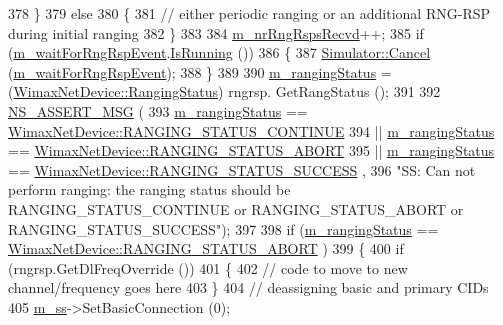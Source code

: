 \begin{DoxyCode}
378     \}
379   \textcolor{keywordflow}{else}
380     \{
381       \textcolor{comment}{// either periodic ranging or an additional RNG-RSP during initial ranging}
382     \}
383 
384   \hyperlink{classns3_1_1SSLinkManager_a52b9d5b8bc2d27a3ef604735ee731afc}{m\_nrRngRspsRecvd}++;
385   \textcolor{keywordflow}{if} (\hyperlink{classns3_1_1SSLinkManager_a6e94b74ad20fe217bf121b94deeca1ba}{m\_waitForRngRspEvent}.\hyperlink{classns3_1_1EventId_aabf8476d1a080c199ea0c6aa9ccea372}{IsRunning} ())
386     \{
387       \hyperlink{classns3_1_1Simulator_a1b903a62d6117ef28f7ba3c6500689bf}{Simulator::Cancel} (\hyperlink{classns3_1_1SSLinkManager_a6e94b74ad20fe217bf121b94deeca1ba}{m\_waitForRngRspEvent});
388     \}
389 
390   \hyperlink{classns3_1_1SSLinkManager_ae21f07956edc47367365d56c7913eee7}{m\_rangingStatus} = (\hyperlink{classns3_1_1WimaxNetDevice_a2a74c0f01e51abc1851a630242e7b591}{WimaxNetDevice::RangingStatus}) rngrsp.
      GetRangStatus ();
391 
392   \hyperlink{assert_8h_aff5ece9066c74e681e74999856f08539}{NS\_ASSERT\_MSG} (
393     \hyperlink{classns3_1_1SSLinkManager_ae21f07956edc47367365d56c7913eee7}{m\_rangingStatus} == \hyperlink{classns3_1_1WimaxNetDevice_a2a74c0f01e51abc1851a630242e7b591ace0a03105b6d7cf2c6ec79e9789dc3a6}{WimaxNetDevice::RANGING\_STATUS\_CONTINUE}
394     || \hyperlink{classns3_1_1SSLinkManager_ae21f07956edc47367365d56c7913eee7}{m\_rangingStatus} == \hyperlink{classns3_1_1WimaxNetDevice_a2a74c0f01e51abc1851a630242e7b591af8ad5e66165cedeaf588275f529a4a98}{WimaxNetDevice::RANGING\_STATUS\_ABORT}
395     || \hyperlink{classns3_1_1SSLinkManager_ae21f07956edc47367365d56c7913eee7}{m\_rangingStatus} == \hyperlink{classns3_1_1WimaxNetDevice_a2a74c0f01e51abc1851a630242e7b591a2a48f503c20971a1a5901af0b6d0746c}{WimaxNetDevice::RANGING\_STATUS\_SUCCESS}
      ,
396     \textcolor{stringliteral}{"SS: Can not perform ranging: the ranging status should be RANGING\_STATUS\_CONTINUE or
       RANGING\_STATUS\_ABORT or RANGING\_STATUS\_SUCCESS"});
397 
398   \textcolor{keywordflow}{if} (\hyperlink{classns3_1_1SSLinkManager_ae21f07956edc47367365d56c7913eee7}{m\_rangingStatus} == \hyperlink{classns3_1_1WimaxNetDevice_a2a74c0f01e51abc1851a630242e7b591af8ad5e66165cedeaf588275f529a4a98}{WimaxNetDevice::RANGING\_STATUS\_ABORT}
      )
399     \{
400       \textcolor{keywordflow}{if} (rngrsp.GetDlFreqOverride ())
401         \{
402           \textcolor{comment}{// code to move to new channel/frequency goes here}
403         \}
404       \textcolor{comment}{// deassigning basic and primary CIDs}
405       \hyperlink{classns3_1_1SSLinkManager_a44506c63befdc33eb0e0b4ba7f93d498}{m\_ss}->SetBasicConnection (0);

\end{DoxyCode}
